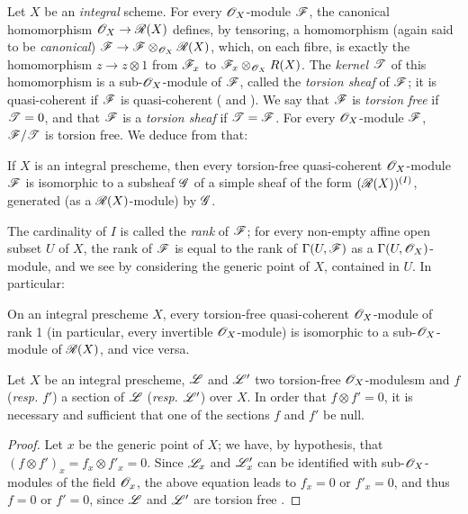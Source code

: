 \begin{env}[7.4.1]
\label{1.7.4.1}
Let $X$ be an \emph{integral} scheme.
For every $\mathscr{O}_X$-module $\mathscr{F}$, the canonical homomorphism $\mathscr{O}_X\to\mathscr{R}(X)$ defines, by tensoring, a homomorphism (again said to be \emph{canonical}) $\mathscr{F}\to\mathscr{F}\otimes_{\mathscr{O}_X}\mathscr{R}(X)$, which, on each fibre, is exactly the homomorphism $z\to z\otimes1$ from $\mathscr{F}_x$ to $\mathscr{F}_x\otimes_{\mathscr{O}_X}R(X)$.
The \emph{kernel $\mathscr{T}$} of this homomorphism is a sub-$\mathscr{O}_X$-module of $\mathscr{F}$, called the \emph{torsion sheaf} of $\mathscr{F}$; it is quasi-coherent if $\mathscr{F}$ is quasi-coherent ( and ).
We say that $\mathscr{F}$ is \emph{torsion free} if $\mathscr{T}=0$, and that $\mathscr{F}$ is a \emph{torsion sheaf} if $\mathscr{T}=\mathscr{F}$.
For every $\mathscr{O}_X$-module $\mathscr{F}$, $\mathscr{F}/\mathscr{T}$ is torsion free.
We deduce from  that:
\end{env}

\begin{prop}[7.4.2]
\label{1.7.4.2}
If $X$ is an integral prescheme, then every torsion-free quasi-coherent $\mathscr{O}_X$-module $\mathscr{F}$ is isomorphic to a subsheaf $\mathscr{G}$ of a simple sheaf of the form $(\mathscr{R}(X))^{(I)}$, generated (as a $\mathscr{R}(X)$-module) by $\mathscr{G}$.
\end{prop}

The cardinality of $I$ is called the \emph{rank} of $\mathscr{F}$; for every non-empty affine open subset $U$ of $X$, the rank of $\mathscr{F}$ is equal to the rank of $\Gamma(U,\mathscr{F})$ as a $\Gamma(U,\mathscr{O}_X)$-module, and we see by considering the generic point of $X$, contained in $U$.
In particular:

\begin{cor}[7.4.3]
\label{1.7.4.3}
On an integral prescheme $X$, every torsion-free quasi-coherent $\mathscr{O}_X$-module of rank 1 (in particular, every invertible $\mathscr{O}_X$-module) is isomorphic to a sub-$\mathscr{O}_X$-module of $\mathscr{R}(X)$, and vice versa.
\end{cor}

\begin{cor}[7.4.4]
\label{1.7.4.4}
Let $X$ be an integral prescheme, $\mathscr{L}$ and $\mathscr{L}'$ two torsion-free $\mathscr{O}_X$-modulesm and $f$ (\emph{resp.} $f'$) a section of $\mathscr{L}$ (\emph{resp.} $\mathscr{L}'$) over $X$.
In order that $f\otimes f'=0$, it is necessary and sufficient that one of the sections $f$ and $f'$ be null.
\end{cor}

\begin{proof}
\label{proof-1.7.4.4}
Let $x$ be the generic point of $X$; we have, by hypothesis, that $(f\otimes f')_x = f_x\otimes f'_x = 0$.
Since $\mathscr{L}_x$ and $\mathscr{L}'_x$ can be identified with sub-$\mathscr{O}_X$-modules of the field $\mathscr{O}_x$, the above equation leads to $f_x=0$ or $f'_x=0$, and thus $f=0$ or $f'=0$, since $\mathscr{L}$ and $\mathscr{L}'$ are torsion free .
\end{proof}

